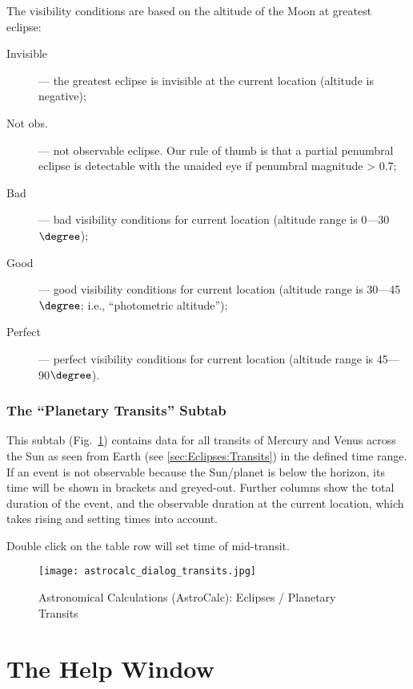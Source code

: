 The visibility conditions are based on the altitude of the Moon at greatest eclipse:
\begin{description}
  \item[Invisible] --- the greatest eclipse is invisible at the current location (altitude is negative);
  \item[Not obs.] --- not observable eclipse. Our rule of thumb is that a partial penumbral eclipse is detectable with the unaided eye if penumbral magnitude > 0.7;
  \item[Bad] --- bad visibility conditions for current location (altitude range is 0---30$\degree$);
  \item[Good] --- good visibility conditions for current location (altitude range is 30---45$\degree$; i.e., ``photometric altitude'');
  \item[Perfect] --- perfect visibility conditions for current location (altitude range is 45---90$\degree$).
\end{description}

\subsubsection{The ``Planetary Transits'' Subtab}
\label{sec:gui:AstroCalc:Eclipses:PlanetaryTransits}

This subtab (Fig.~\ref{fig:gui:AstroCalc:Eclipses:PlanetaryTransits})
contains data for all transits of Mercury and Venus across the Sun as
seen from Earth (see \ref{sec:Eclipses:Transits}) in the defined time
range.  If an event is not observable because the Sun/planet is below
the horizon, its time will be shown in brackets and
greyed-out. Further columns show the total duration of the event, and
the observable duration at the current location, which takes rising
and setting times into account.

Double click on the table row will set time of mid-transit.

\begin{figure}[htp]
\centering\texttt{[image: astrocalc\_dialog\_transits.jpg]}
\caption{Astronomical Calculations (AstroCalc): Eclipses / Planetary Transits}
\label{fig:gui:AstroCalc:Eclipses:PlanetaryTransits}
\end{figure}

\clearpage
\section{The Help Window}
\label{sec:gui:help}

